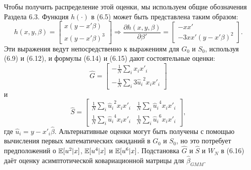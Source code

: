 Чтобы получить распределение этой оценки, мы используем общие обозначения Раздела 6.3. Функция $h(\cdot)$ в (6.5) может быть представлена таким образом:
\[
h(x,y,\beta)= \begin{bmatrix} x(y-x'\beta)  \\ x(y-x'\beta)^3 \end{bmatrix} \Rightarrow \frac{\partial h(x,y,\beta)}{\partial \beta'}= \begin{bmatrix} -xx' \\ -3xx'(y-x'\beta)^2 \end{bmatrix}.
\]
Эти выражения ведут непосредственно к выражениям для $G_0$ и $S_0$, используя (6.9) и (6.12), и формулы (6.14) и (6.15) дают состоятельные оценки:
\begin{equation}
\hat{G}= \begin{bmatrix} -\frac{1}{N} \sum_i x_i x'_i \\ -\frac{1}{N} \sum_i 3 {\hat{u}_i}^2 x_i x'_i \end{bmatrix}
\end{equation}
и
\begin{equation}
\hat{S}= \begin{bmatrix} \frac{1}{N} \sum_i {\hat{u}_i}^2 x_i x'_i & \frac{1}{N} \sum_i {\hat{u}_i}^4 x_i x'_i \\ \frac{1}{N} \sum_i {\hat{u}_i}^4 x_i x'_i & \frac{1}{N} \sum_i {\hat{u}_i}^6 x_i x'_i \end{bmatrix},
\end{equation}
где $\hat{u}_i=y-x'_i \hat{\beta}$. Альтернативные оценки могут быть получены с помощью вычисления первых математических ожиданий в $G_0$ и $S_0$, но это потребует предположений о $\mathbb{E}[u^2|x]$, $\mathbb{E}[u^4|x]$ и $\mathbb{E}[u^6|x]$. Подстановка $\hat{G}$ и $\hat{S}$ и $W_N$ в (6.16) даёт оценку асимптотической ковариационной матрицы для $\hat{\beta}_{GMM}$.

